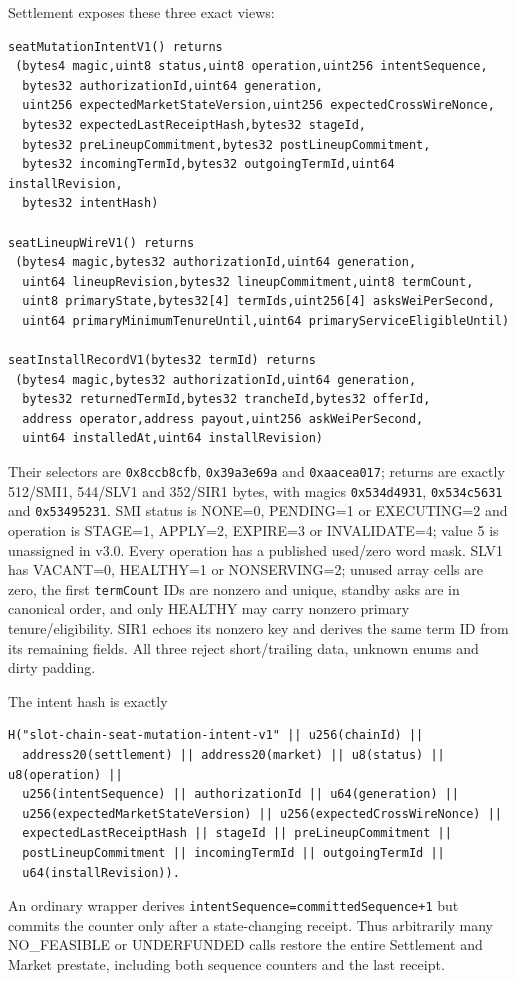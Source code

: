 \documentclass[a4paper,11pt]{article}
\newcommand{\code}[1]{\nolinkurl{#1}}
\begin{document}
Settlement exposes these three exact views:
\begin{verbatim}
seatMutationIntentV1() returns
 (bytes4 magic,uint8 status,uint8 operation,uint256 intentSequence,
  bytes32 authorizationId,uint64 generation,
  uint256 expectedMarketStateVersion,uint256 expectedCrossWireNonce,
  bytes32 expectedLastReceiptHash,bytes32 stageId,
  bytes32 preLineupCommitment,bytes32 postLineupCommitment,
  bytes32 incomingTermId,bytes32 outgoingTermId,uint64 installRevision,
  bytes32 intentHash)

seatLineupWireV1() returns
 (bytes4 magic,bytes32 authorizationId,uint64 generation,
  uint64 lineupRevision,bytes32 lineupCommitment,uint8 termCount,
  uint8 primaryState,bytes32[4] termIds,uint256[4] asksWeiPerSecond,
  uint64 primaryMinimumTenureUntil,uint64 primaryServiceEligibleUntil)

seatInstallRecordV1(bytes32 termId) returns
 (bytes4 magic,bytes32 authorizationId,uint64 generation,
  bytes32 returnedTermId,bytes32 trancheId,bytes32 offerId,
  address operator,address payout,uint256 askWeiPerSecond,
  uint64 installedAt,uint64 installRevision)
\end{verbatim}
Their selectors are \code{0x8ccb8cfb}, \code{0x39a3e69a} and
\code{0xaacea017}; returns are exactly 512/SMI1, 544/SLV1 and 352/SIR1 bytes,
with magics \code{0x534d4931}, \code{0x534c5631} and \code{0x53495231}.
SMI status is NONE=0, PENDING=1 or EXECUTING=2 and operation is STAGE=1,
APPLY=2, EXPIRE=3 or INVALIDATE=4; value 5 is unassigned in v3.0.  Every
operation has a published used/zero word mask.  SLV1 has VACANT=0, HEALTHY=1 or NONSERVING=2;
unused array cells are zero, the first \code{termCount} IDs are nonzero and
unique, standby asks are in canonical order, and only HEALTHY may carry nonzero
primary tenure/eligibility.  SIR1 echoes its nonzero key and derives the same
term ID from its remaining fields.  All three reject short/trailing data,
unknown enums and dirty padding.

The intent hash is exactly
\begin{verbatim}
H("slot-chain-seat-mutation-intent-v1" || u256(chainId) ||
  address20(settlement) || address20(market) || u8(status) || u8(operation) ||
  u256(intentSequence) || authorizationId || u64(generation) ||
  u256(expectedMarketStateVersion) || u256(expectedCrossWireNonce) ||
  expectedLastReceiptHash || stageId || preLineupCommitment ||
  postLineupCommitment || incomingTermId || outgoingTermId ||
  u64(installRevision)).
\end{verbatim}
An ordinary wrapper derives \code{intentSequence=committedSequence+1} but
commits the counter only after a state-changing receipt.  Thus arbitrarily many
NO\_FEASIBLE or UNDERFUNDED calls restore the entire Settlement and Market
prestate, including both sequence counters and the last receipt.
\end{document}

